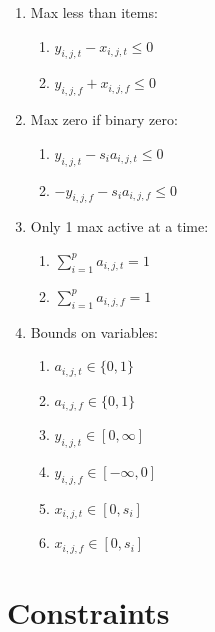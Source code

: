 \documentclass[a4paper]{article}
\begin{document}
\begin{enumerate}
    \item Max less than items:
        \begin{enumerate}
            \item $y_{i,j,t} - x_{i,j,t} \leq 0$
            \item $y_{i,j,f} + x_{i,j,f} \leq 0$
        \end{enumerate}
    \item Max zero if binary zero:
        \begin{enumerate}
            \item $y_{i,j,t} - s_i a_{i,j,t} \leq 0$
            \item $-y_{i,j,f} - s_i a_{i,j,f} \leq 0$
        \end{enumerate}
    \item Only 1 max active at a time:
        \begin{enumerate}
            \item $\sum_{i=1}^p a_{i,j,t} = 1$ 
            \item $\sum_{i=1}^p a_{i,j,f} = 1$
        \end{enumerate}
    \item Bounds on variables:
        \begin{enumerate}
            \item $a_{i,j,t} \in \{0, 1\}$
            \item $a_{i,j,f} \in \{0, 1\}$
            \item $y_{i,j,t} \in [0, \infty]$
            \item $y_{i,j,f} \in [-\infty, 0]$
            \item $x_{i,j,t} \in [0, s_i]$
            \item $x_{i,j,f} \in [0, s_i]$
        \end{enumerate}
\end{enumerate}

\section{Constraints}
\end{document}
